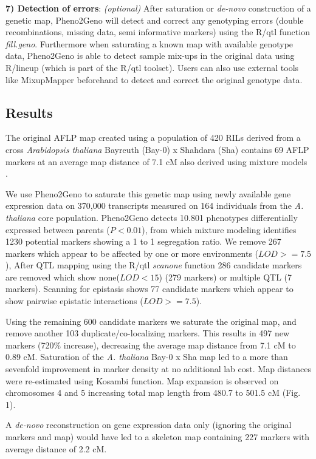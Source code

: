 {\bf 7) Detection of errors}: \emph{(optional)}
After saturation or \emph{de-novo} construction of a genetic map, Pheno2Geno will detect and 
correct any genotyping errors (double recombinations, missing data, semi informative markers) 
using the R/qtl function \emph{fill.geno}. Furthermore when saturating a known map with available 
genotype data, Pheno2Geno is able to detect sample mix-ups in the original data using R/lineup 
(which is part of the R/qtl toolset). Users can also use external tools like MixupMapper \cite{Westra:2011} 
beforehand to detect and correct the original genotype data.

\subsection{Results}
The original AFLP map created using a population of 420 RILs derived from a cross \emph{Arabidopsis 
thaliana} Bayreuth (Bay-0) x Shahdara (Sha) \cite{Loudet:2002} contains 69 AFLP markers at an 
average map distance of 7.1 cM also derived using mixture models \cite{Jansen:2001b, Loudet:2002}.

We use Pheno2Geno to saturate this genetic map using newly available gene expression data on 
370,000 transcripts measured on 164 individuals from the \emph{A. thaliana} core population. 
Pheno2Geno detects 10.801 phenotypes differentially expressed between parents ($P < 0.01$), from 
which mixture modeling identifies 1230 potential markers showing a 1 to 1 segregation ratio. We 
remove 267 markers which appear to be affected by one or more environments ($LOD >= 7.5$), 
After QTL mapping using the R/qtl \emph{scanone} function 286 candidate markers are removed 
which show none($LOD < 15$) (279 markers) or multiple QTL (7 markers). Scanning for epistasis 
shows 77 candidate markers which appear to show pairwise epistatic interactions ($LOD >= 7.5$). 

Using the remaining 600 candidate markers we saturate the original map, and remove another 103 
duplicate/co-localizing markers. This results in 497 new markers (720\% increase), decreasing 
the average map distance from 7.1 cM to 0.89 cM. Saturation of the \emph{A. thaliana} Bay-0 x 
Sha map led to a more than sevenfold improvement in marker density at no additional lab cost. Map 
distances were re-estimated using Kosambi function. Map expansion is observed on chromosomes 4 
and 5 increasing total map length from 480.7 to 501.5 cM (Fig. 1). 

A \emph{de-novo} reconstruction on gene expression data only (ignoring the original markers and map) 
would have led to a skeleton map containing 227 markers with average distance of 2.2 cM.


